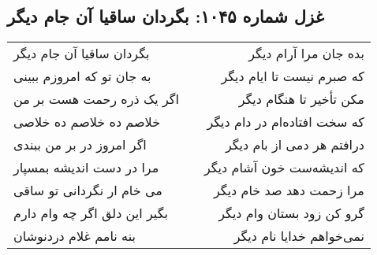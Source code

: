 \begin{center}
\section*{غزل شماره ۱۰۴۵: بگردان ساقیا آن جام دیگر}
\label{sec:1045}
\begin{longtable}{l p{0.5cm} r}
بگردان ساقیا آن جام دیگر
&&
بده جان مرا آرام دیگر
\\
به جان تو که امروزم ببینی
&&
که صبرم نیست تا ایام دیگر
\\
اگر یک ذره رحمت هست بر من
&&
مکن تأخیر تا هنگام دیگر
\\
خلاصم ده خلاصم ده خلاصی
&&
که سخت افتاده‌ام در دام دیگر
\\
اگر امروز در بر من ببندی
&&
درافتم هر دمی از بام دیگر
\\
مرا در دست اندیشه بمسپار
&&
که اندیشه‌ست خون آشام دیگر
\\
می خام ار نگردانی تو ساقی
&&
مرا زحمت دهد صد خام دیگر
\\
بگیر این دلق اگر چه وام دارم
&&
گرو کن زود بستان وام دیگر
\\
بنه نامم غلام دردنوشان
&&
نمی‌خواهم خدایا نام دیگر
\\
\end{longtable}
\end{center}
